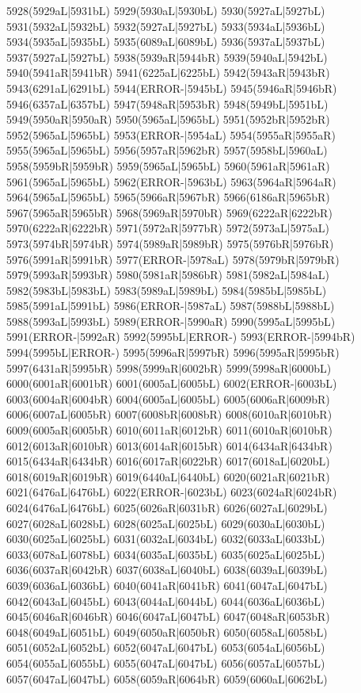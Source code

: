5928(5929aL|5931bL) 5929(5930aL|5930bL) 5930(5927aL|5927bL) \\5931(5932aL|5932bL) 5932(5927aL|5927bL) 5933(5934aL|5936bL) 5934(5935aL|5935bL) 5935(6089aL|6089bL) 5936(5937aL|5937bL) 5937(5927aL|5927bL) 5938(5939aR|5944bR) 5939(5940aL|5942bL) \\5940(5941aR|5941bR) 5941(6225aL|6225bL) 5942(5943aR|5943bR) 5943(6291aL|6291bL) 5944(ERROR-|5945bL) 5945(5946aR|5946bR) 5946(6357aL|6357bL) 5947(5948aR|5953bR) 5948(5949bL|5951bL) \\5949(5950aR|5950aR) 5950(5965aL|5965bL) 5951(5952bR|5952bR) 5952(5965aL|5965bL) 5953(ERROR-|5954aL) 5954(5955aR|5955aR) 5955(5965aL|5965bL) 5956(5957aR|5962bR) 5957(5958bL|5960aL) \\5958(5959bR|5959bR) 5959(5965aL|5965bL) 5960(5961aR|5961aR) 5961(5965aL|5965bL) 5962(ERROR-|5963bL) 5963(5964aR|5964aR) 5964(5965aL|5965bL) 5965(5966aR|5967bR) 5966(6186aR|5965bR) \\5967(5965aR|5965bR) 5968(5969aR|5970bR) 5969(6222aR|6222bR) 5970(6222aR|6222bR) 5971(5972aR|5977bR) 5972(5973aL|5975aL) 5973(5974bR|5974bR) 5974(5989aR|5989bR) 5975(5976bR|5976bR) \\5976(5991aR|5991bR) 5977(ERROR-|5978aL) 5978(5979bR|5979bR) 5979(5993aR|5993bR) 5980(5981aR|5986bR) 5981(5982aL|5984aL) 5982(5983bL|5983bL) 5983(5989aL|5989bL) 5984(5985bL|5985bL) \\5985(5991aL|5991bL) 5986(ERROR-|5987aL) 5987(5988bL|5988bL) 5988(5993aL|5993bL) 5989(ERROR-|5990aR) 5990(5995aL|5995bL) 5991(ERROR-|5992aR) 5992(5995bL|ERROR-) 5993(ERROR-|5994bR) \\5994(5995bL|ERROR-) 5995(5996aR|5997bR) 5996(5995aR|5995bR) 5997(6431aR|5995bR) 5998(5999aR|6002bR) 5999(5998aR|6000bL) 6000(6001aR|6001bR) 6001(6005aL|6005bL) 6002(ERROR-|6003bL) \\6003(6004aR|6004bR) 6004(6005aL|6005bL) 6005(6006aR|6009bR) 6006(6007aL|6005bR) 6007(6008bR|6008bR) 6008(6010aR|6010bR) 6009(6005aR|6005bR) 6010(6011aR|6012bR) 6011(6010aR|6010bR) \\6012(6013aR|6010bR) 6013(6014aR|6015bR) 6014(6434aR|6434bR) 6015(6434aR|6434bR) 6016(6017aR|6022bR) 6017(6018aL|6020bL) 6018(6019aR|6019bR) 6019(6440aL|6440bL) 6020(6021aR|6021bR) \\6021(6476aL|6476bL) 6022(ERROR-|6023bL) 6023(6024aR|6024bR) 6024(6476aL|6476bL) 6025(6026aR|6031bR) 6026(6027aL|6029bL) 6027(6028aL|6028bL) 6028(6025aL|6025bL) 6029(6030aL|6030bL) \\6030(6025aL|6025bL) 6031(6032aL|6034bL) 6032(6033aL|6033bL) 6033(6078aL|6078bL) 6034(6035aL|6035bL) 6035(6025aL|6025bL) 6036(6037aR|6042bR) 6037(6038aL|6040bL) 6038(6039aL|6039bL) \\6039(6036aL|6036bL) 6040(6041aR|6041bR) 6041(6047aL|6047bL) 6042(6043aL|6045bL) 6043(6044aL|6044bL) 6044(6036aL|6036bL) 6045(6046aR|6046bR) 6046(6047aL|6047bL) 6047(6048aR|6053bR) \\6048(6049aL|6051bL) 6049(6050aR|6050bR) 6050(6058aL|6058bL) 6051(6052aL|6052bL) 6052(6047aL|6047bL) 6053(6054aL|6056bL) 6054(6055aL|6055bL) 6055(6047aL|6047bL) 6056(6057aL|6057bL) \\6057(6047aL|6047bL) 6058(6059aR|6064bR) 6059(6060aL|6062bL) 